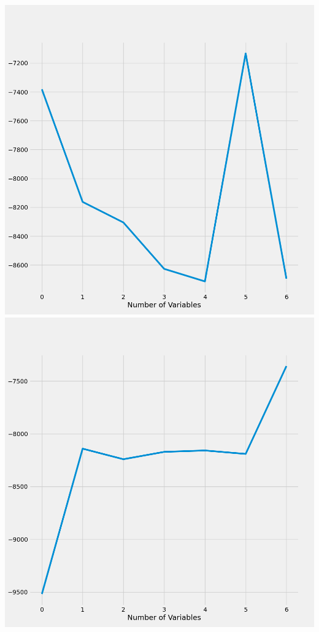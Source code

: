 \documentclass{article}
\begin{document}
	\includegraphics[scale = 0.2]{../plots/python/AICConcreteForwardPCP.png} 
	\includegraphics[scale = 0.2]{../plots/python/AICConcreteBackwardPCP.png}
\end{document}

